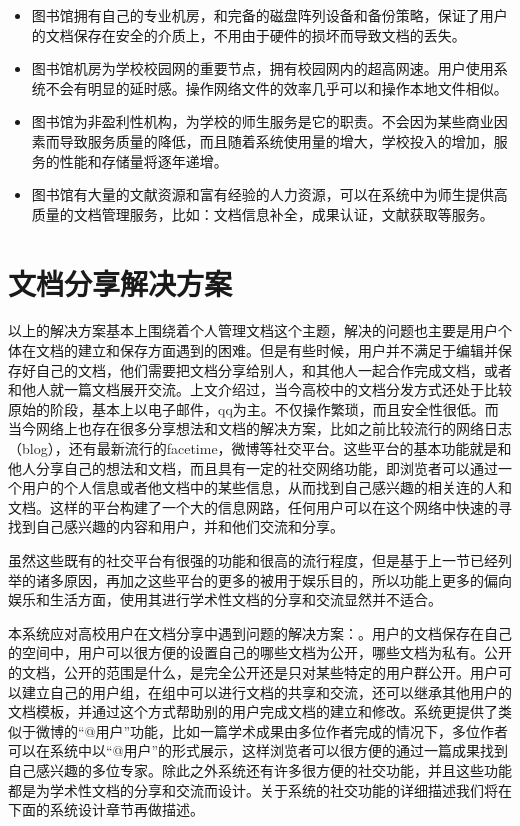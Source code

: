 \begin{itemize}
\item 图书馆拥有自己的专业机房，和完备的磁盘阵列设备和备份策略，保证了用户的文档保存在安全的介质上，不用由于硬件的损坏而导致文档的丢失。%
\item 图书馆机房为学校校园网的重要节点，拥有校园网内的超高网速。用户使用系统不会有明显的延时感。操作网络文件的效率几乎可以和操作本地文件相似。
\item 图书馆为非盈利性机构，为学校的师生服务是它的职责。不会因为某些商业因素而导致服务质量的降低，而且随着系统使用量的增大，学校投入的增加，服务的性能和存储量将逐年递增。
\item 图书馆有大量的文献资源和富有经验的人力资源，可以在系统中为师生提供高质量的文档管理服务，比如：文档信息补全，成果认证，文献获取等服务。
\end{itemize}

\section{文档分享解决方案}
\label{sec:giveout}

以上的解决方案基本上围绕着个人管理文档这个主题，解决的问题也主要是用户个体在文档的建立和保存方面遇到的困难。但是有些时候，用户并不满足于编辑并保存好自己的文档，他们需要把文档分享给别人，和其他人一起合作完成文档，或者和他人就一篇文档展开交流。上文介绍过，当今高校中的文档分发方式还处于比较原始的阶段，基本上以电子邮件，qq为主。不仅操作繁琐，而且安全性很低。而当今网络上也存在很多分享想法和文档的解决方案，比如之前比较流行的网络日志（blog），还有最新流行的facetime，微博等社交平台。这些平台的基本功能就是和他人分享自己的想法和文档，而且具有一定的社交网络功能，即浏览者可以通过一个用户的个人信息或者他文档中的某些信息，从而找到自己感兴趣的相关连的人和文档。这样的平台构建了一个大的信息网路，任何用户可以在这个网络中快速的寻找到自己感兴趣的内容和用户，并和他们交流和分享。

虽然这些既有的社交平台有很强的功能和很高的流行程度，但是基于上一节已经列举的诸多原因，再加之这些平台的更多的被用于娱乐目的，所以功能上更多的偏向娱乐和生活方面，使用其进行学术性文档的分享和交流显然并不适合。

本系统应对高校用户在文档分享中遇到问题的解决方案：。用户的文档保存在自己的空间中，用户可以很方便的设置自己的哪些文档为公开，哪些文档为私有。公开的文档，公开的范围是什么，是完全公开还是只对某些特定的用户群公开。用户可以建立自己的用户组，在组中可以进行文档的共享和交流，还可以继承其他用户的文档模板，并通过这个方式帮助别的用户完成文档的建立和修改。系统更提供了类似于微博的“@用户”功能，比如一篇学术成果由多位作者完成的情况下，多位作者可以在系统中以“@用户”的形式展示，这样浏览者可以很方便的通过一篇成果找到自己感兴趣的多位专家。除此之外系统还有许多很方便的社交功能，并且这些功能都是为学术性文档的分享和交流而设计。关于系统的社交功能的详细描述我们将在下面的系统设计章节再做描述。
